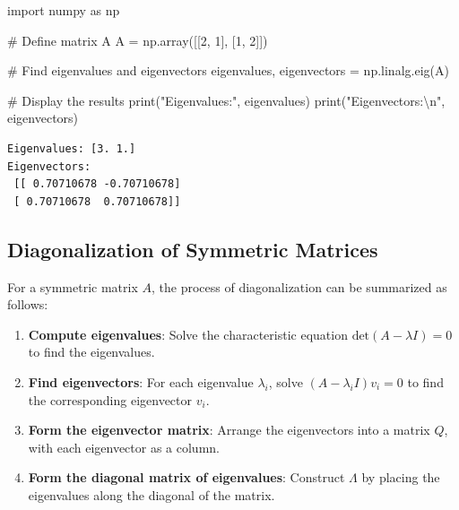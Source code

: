 \documentclass[
  letterpaper,
  DIV=11,
  numbers=noendperiod]{scrreprt}
\newenvironment{Shaded}{\begin{snugshade}}{\end{snugshade}}
\newcommand{\BuiltInTok}[1]{\textcolor[rgb]{0.00,0.23,0.31}{#1}}
\newcommand{\CharTok}[1]{\textcolor[rgb]{0.13,0.47,0.30}{#1}}
\newcommand{\CommentTok}[1]{\textcolor[rgb]{0.37,0.37,0.37}{#1}}
\newcommand{\DecValTok}[1]{\textcolor[rgb]{0.68,0.00,0.00}{#1}}
\newcommand{\ImportTok}[1]{\textcolor[rgb]{0.00,0.46,0.62}{#1}}
\newcommand{\NormalTok}[1]{\textcolor[rgb]{0.00,0.23,0.31}{#1}}
\newcommand{\OperatorTok}[1]{\textcolor[rgb]{0.37,0.37,0.37}{#1}}
\newcommand{\StringTok}[1]{\textcolor[rgb]{0.13,0.47,0.30}{#1}}
\theoremstyle{plain}
\theoremstyle{definition}
\theoremstyle{remark}
\begin{document}
\begin{Shaded}
\begin{Highlighting}[]
\ImportTok{import}\NormalTok{ numpy }\ImportTok{as}\NormalTok{ np}

\CommentTok{\# Define matrix A}
\NormalTok{A }\OperatorTok{=}\NormalTok{ np.array([[}\DecValTok{2}\NormalTok{, }\DecValTok{1}\NormalTok{], }
\NormalTok{              [}\DecValTok{1}\NormalTok{, }\DecValTok{2}\NormalTok{]])}

\CommentTok{\# Find eigenvalues and eigenvectors}
\NormalTok{eigenvalues, eigenvectors }\OperatorTok{=}\NormalTok{ np.linalg.eig(A)}

\CommentTok{\# Display the results}
\BuiltInTok{print}\NormalTok{(}\StringTok{"Eigenvalues:"}\NormalTok{, eigenvalues)}
\BuiltInTok{print}\NormalTok{(}\StringTok{"Eigenvectors:}\CharTok{\textbackslash{}n}\StringTok{"}\NormalTok{, eigenvectors)}
\end{Highlighting}
\end{Shaded}

\begin{verbatim}
Eigenvalues: [3. 1.]
Eigenvectors:
 [[ 0.70710678 -0.70710678]
 [ 0.70710678  0.70710678]]
\end{verbatim}

\subsection{Diagonalization of Symmetric
Matrices}\label{diagonalization-of-symmetric-matrices}

For a symmetric matrix \(A\), the process of diagonalization can be
summarized as follows:

\begin{enumerate}
\def\labelenumi{\arabic{enumi}.}
\item
  \textbf{Compute eigenvalues}: Solve the characteristic equation
  \(\text{det}(A - \lambda I) = 0\) to find the eigenvalues.
\item
  \textbf{Find eigenvectors}: For each eigenvalue \(\lambda_i\), solve
  \((A - \lambda_i I)v_i = 0\) to find the corresponding eigenvector
  \(v_i\).
\item
  \textbf{Form the eigenvector matrix}: Arrange the eigenvectors into a
  matrix \(Q\), with each eigenvector as a column.
\item
  \textbf{Form the diagonal matrix of eigenvalues}: Construct
  \(\Lambda\) by placing the eigenvalues along the diagonal of the
  matrix.
\end{enumerate}
\end{document}
